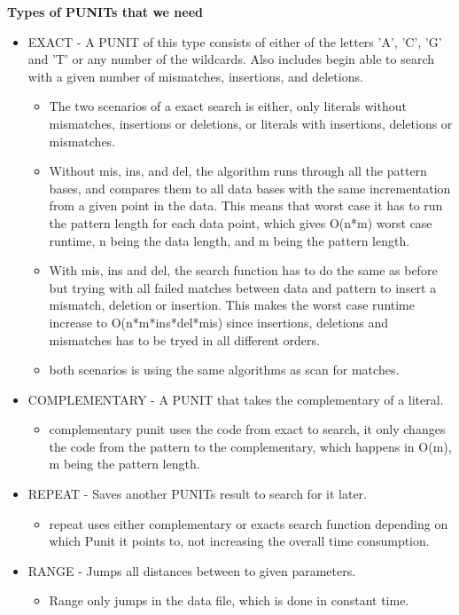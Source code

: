 \documentclass[12pt]{article}
\begin{document}
\textbf{Types of PUNITs that we need}
\begin{itemize}
\item EXACT - A PUNIT of this type consists of either of the letters 'A', 'C', 'G' and 'T' or any number of the wildcards. Also includes begin able to search with a given number of mismatches, insertions, and deletions.
\begin{itemize}
  \item The two scenarios of a exact search is either, only literals without mismatches, insertions or deletions, or literals with insertions, deletions or mismatches.
  \item Without mis, ins, and del, the algorithm runs through all the pattern bases, and compares them to all data bases with the same incrementation from a given point in the data. This means that worst case it has to run the pattern length for each data point, which gives O(n*m) worst case runtime, n being the data length, and m being the pattern length.
  \item With mis, ins and del, the search function has to do the same as before but trying with all failed matches between data and pattern to insert a mismatch, deletion or insertion. This makes the worst case runtime increase to O(n*m*ins*del*mis) since insertions, deletions and mismatches has to be tryed in all different orders.
  \item both scenarios is using the same algorithms as scan for matches.
\end{itemize}
\item COMPLEMENTARY - A PUNIT that takes the complementary of a literal.
\begin{itemize}
  \item complementary punit uses the code from exact to search, it only changes the code from the pattern to the complementary, which happens in O(m), m being the pattern length.
\end{itemize}
\item REPEAT - Saves another PUNITs result to search for it later.
\begin{itemize}
  \item repeat uses either complementary or exacts search function depending on which Punit it points to, not increasing the overall time consumption.
\end{itemize}
\item RANGE - Jumps all distances between to given parameters.
\begin{itemize}
  \item Range only jumps in the data file, which is done in constant time.
\end{itemize}
\end{itemize}
\end{document}
